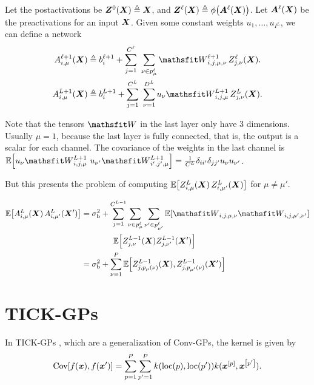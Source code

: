 \documentclass{article} %
\newcommand{\bracket}[3]{{\left#1 #3 \right#2}}
\newcommand{\bra}{\bracket{(}{)}}
\newcommand{\sqb}{\bracket{[}{]}}
\newcommand{\ssup}[1]{^{#1}}
\newcommand{\eqdef}{\triangleq}
\newcommand{\patch}[2]{{p\ssup{#1}_{#2}}}
\begin{document}
Let the postactivations be $\mZ\ssup{0}(\mX) \eqdef \mX$, and
$\mZ\ssup{\ell}(\mX) \eqdef \phi\bra{\mA\ssup{\ell}(\mX)}$. Let
$\mA\ssup{\ell}(\mX)$ be the preactivations for an input ${\bm{X}}$. Given some
constant weights ${u_1, \dots, u_{I\ssup{L}}}$, we can define a network
\begin{align}
  \emA_{i,\mu}\ssup{\ell+1}(\mX) &\eqdef \evb_i\ssup{\ell+1} +
  \sum_{j=1}^{C\ssup{\ell}} \ \sum_{\nu\in\patch{\ell}{\mu}} \etW\ssup{\ell+1}_{i,j,\mu,\nu}\, \emZ\ssup{\ell}_{j,\nu}(\mX).
  \label{eq:convgp-network-recursive} \\
  \emA_{i,\mu}\ssup{L+1}(\mX) &\eqdef \evb_i\ssup{L+1} +
                                   \sum_{j=1}^{C\ssup{L}} \ \sum_{\nu=1}^{D\ssup{L}} u_\nu \etW\ssup{L+1}_{i,j,\mu}\, \emZ\ssup{L}_{j,\nu}(\mX).
                                   \label{eq:convgp-network-final}
\end{align}

Note that the tensors $\etW$ in the last layer only have 3 dimensions. Usually
$\mu=1$, because the last layer is fully connected, that is, the output is a
scalar for each channel. The covariance of the weights in the last channel is
$\E\sqb{u_\nu\etW\ssup{L+1}_{i,j,\mu}\ u_{\nu'}\etW\ssup{L+1}_{i',j',\mu}} =
\frac{1}{C\ssup{L}}\delta_{ii'}\delta_{jj'}\evu_\nu \evu_{\nu'}$.

But this presents the problem of computing
$\E\sqb{\emZ\ssup{L}_{i,\mu}(\mX)\, \emZ\ssup{L}_{i,\mu'}(\mX)}$ for $\mu\neq
\mu'$.

\begin{equation}
\begin{aligned}
  \E\sqb{\emA\ssup{L}_{i,\mu}(\mX)\, \emA\ssup{L}_{i,\mu'}(\mX')} &= \sigma_\text{b}^2
  + \sum_{j=1}^{C\ssup{L-1}} \sum_{\nu\in \patch{\ell}{\mu}}\sum_{\nu'\in \patch{\ell}{\mu'}} \E\sqb{\etW_{i,j,\mu,\nu} \etW_{i,j,\mu',\nu'}}\\
  &\hspace{4em}\E\sqb{Z\ssup{L-1}_{j,\nu}(\mX)Z\ssup{L-1}_{j,\nu'}(\mX')} \\
  &= \sigma_\text{b}^2 + \sum_{\nu=1}^P \E\sqb{Z\ssup{L-1}_{j,p_\mu(\nu)}(\mX), Z\ssup{L-1}_{j,p_{\mu'}(\nu)}(\mX')}
\end{aligned}
\end{equation}


\section{TICK-GPs}
In TICK-GPs \citep{dutordoir2019tick}, which are a generalization of Conv-GPs, the kernel is given by
\begin{equation}
\Cov\sqb{f(\vx), f(\vx')} = \sum_{p=1}^P\sum_{p'=1}^P k\bra{\text{loc}\bra{p}, \text{loc}\bra{p'}} k(\vx^\sqb{p}, \vx^\sqb{p'}).
\end{equation}
\end{document}
